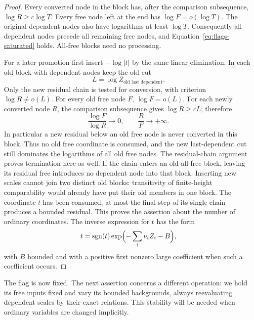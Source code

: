 \begin{proof}
Every converted node in the block has, after the comparison
subsequence, $\log R\ge c\log T$. Every free node left at the end
has $\log F=o(\log T)$. The original dependent nodes also have
logarithms at least $\log T$. Consequently all dependent nodes
precede all remaining free nodes, and
Equation~\eqref{eq:flags-saturated} holds. All-free blocks need no
processing.

For a later promotion first insert $-\log|t|$ by the same linear
elimination. In each old block with dependent nodes keep the old cut
\[
 L=\log Z_{\text{old last dependent}}.
\]
Only the new residual chain is tested for conversion, with criterion
$\log R\ne o(L)$. For every old free node $F$,
$\log F=o(L)$. For each newly converted node $R$, the comparison
subsequence gives $\log R\ge cL$; therefore
\begin{equation}\label{eq:flags-old-free}
 \frac{\log F}{\log R}\longrightarrow0,
 \qquad \frac{R}{F}\longrightarrow+\infty.
\end{equation}
In particular a new residual below an old free node is never converted
in this block. Thus no old free coordinate is consumed, and the new
last-dependent cut still dominates the logarithms of all old free
nodes. The residual-chain argument proves termination here as well.
If the chain enters an old all-free block, leaving its residual free
introduces no dependent node into that block. Inserting new scales
cannot join two distinct old blocks: transitivity of finite-height
comparability would already have put their old members in one block.
The coordinate $t$ has been consumed; at most the final step of its
single chain produces a bounded residual. This proves the assertion
about the number of ordinary coordinates. The inverse expression for
$t$ has the form
\[
 t=\operatorname{sgn}(t)\exp\Bigl(-\sum_i\nu_iZ_i-B\Bigr),
\]
with $B$ bounded and with a positive first nonzero large coefficient
when such a coefficient occurs.

\end{proof}

The flag is now fixed. The next assertion concerns a different operation:
we hold its free inputs fixed and vary its bounded backgrounds, always
reevaluating dependent scales by their exact relations. This stability
will be needed when ordinary variables are changed implicitly.

